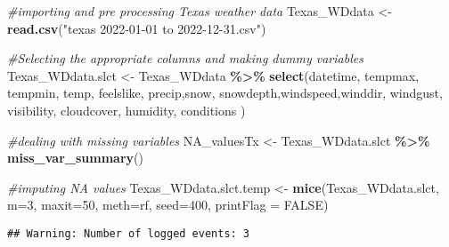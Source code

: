 \documentclass[
]{article}
\newenvironment{Shaded}{\begin{snugshade}}{\end{snugshade}}
\newcommand{\AttributeTok}[1]{\textcolor[rgb]{0.13,0.29,0.53}{#1}}
\newcommand{\CommentTok}[1]{\textcolor[rgb]{0.56,0.35,0.01}{\textit{#1}}}
\newcommand{\ConstantTok}[1]{\textcolor[rgb]{0.56,0.35,0.01}{#1}}
\newcommand{\DecValTok}[1]{\textcolor[rgb]{0.00,0.00,0.81}{#1}}
\newcommand{\FunctionTok}[1]{\textcolor[rgb]{0.13,0.29,0.53}{\textbf{#1}}}
\newcommand{\NormalTok}[1]{#1}
\newcommand{\OtherTok}[1]{\textcolor[rgb]{0.56,0.35,0.01}{#1}}
\newcommand{\SpecialCharTok}[1]{\textcolor[rgb]{0.81,0.36,0.00}{\textbf{#1}}}
\newcommand{\StringTok}[1]{\textcolor[rgb]{0.31,0.60,0.02}{#1}}
\begin{document}
\begin{Shaded}
\begin{Highlighting}[]
\CommentTok{\#importing  and pre processing Texas weather data }
\NormalTok{Texas\_WDdata }\OtherTok{\textless{}{-}} \FunctionTok{read.csv}\NormalTok{(}\StringTok{"texas 2022{-}01{-}01 to 2022{-}12{-}31.csv"}\NormalTok{)}

\CommentTok{\#Selecting the appropriate columns and making dummy variables }
\NormalTok{Texas\_WDdata.slct }\OtherTok{\textless{}{-}}\NormalTok{ Texas\_WDdata }\SpecialCharTok{\%\textgreater{}\%}
  \FunctionTok{select}\NormalTok{(datetime, tempmax, tempmin, temp, }
\NormalTok{          feelslike, precip,snow, snowdepth,windspeed,winddir, }
\NormalTok{          windgust, visibility, cloudcover, humidity, conditions )}

\CommentTok{\#dealing with missing variables}
\NormalTok{NA\_valuesTx }\OtherTok{\textless{}{-}}\NormalTok{ Texas\_WDdata.slct }\SpecialCharTok{\%\textgreater{}\%}
  \FunctionTok{miss\_var\_summary}\NormalTok{()}

\CommentTok{\#imputing NA values}
\NormalTok{Texas\_WDdata.slct.temp }\OtherTok{\textless{}{-}} \FunctionTok{mice}\NormalTok{(Texas\_WDdata.slct,}
                               \AttributeTok{m=}\DecValTok{3}\NormalTok{, }
                               \AttributeTok{maxit=}\DecValTok{50}\NormalTok{, }
                               \AttributeTok{meth=}\StringTok{\textquotesingle{}rf\textquotesingle{}}\NormalTok{, }
                               \AttributeTok{seed=}\DecValTok{400}\NormalTok{, }
                               \AttributeTok{printFlag =} \ConstantTok{FALSE}\NormalTok{)}
\end{Highlighting}
\end{Shaded}

\begin{verbatim}
## Warning: Number of logged events: 3
\end{verbatim}
\end{document}
